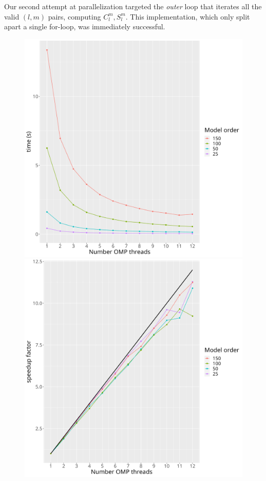 \documentclass[a4paper]{article}
\theoremstyle{definition}
\begin{document}
    Our second attempt at parallelization targeted the \textit{outer} loop that iterates all the valid $(l, m)$ pairs, computing $C_l^m, S_l^m$. This implementation, which only split 
    apart a single for-loop, was immediately successful.
    
\begin{figure}[h!]
    \centering
    \begin{minipage}{0.45\textwidth}
        \includegraphics[width=0.9\linewidth]{media/omp_execution.png}
    \end{minipage}
    \begin{minipage}{0.45\textwidth}
        \includegraphics[width=0.9\linewidth]{media/omp_speedup.png}
    \end{minipage}
\end{figure}
\end{document}
